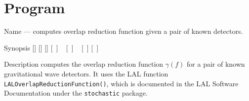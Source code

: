 
\section{Program }
\label{program:lalapps-olapredfcn}

\begin{entry}

\item[Name]
 --- computes overlap reduction function given
a pair of known detectors.

\item[Synopsis]
 \newline \hspace*{0.5in}
[] \newline \hspace*{0.5in}
[] \newline \hspace*{0.5in}
[] \newline \hspace*{0.5in}
[~] \newline \hspace*{0.5in}
~ \newline \hspace*{0.5in}
[~] \newline \hspace*{0.5in}
~ \newline \hspace*{0.5in}
[~] \newline \hspace*{0.5in}
[~] \newline \hspace*{0.5in}
~ \newline \hspace*{0.5in}
~ \newline \hspace*{0.5in}
~

\item[Description]
 computes the overlap reduction function
$\gamma(f)$ for a pair of known gravitational wave detectors. It uses
the LAL function \texttt{LALOverlapReductionFunction()}, which is
documented in the LAL Software Documentation under the
\texttt{stochastic} package.


\end{entry}
